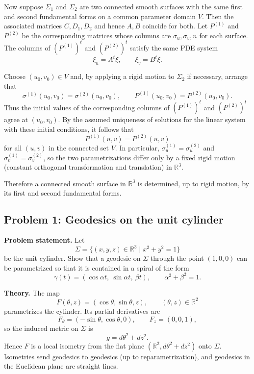 \documentclass[12pt,a4paper]{article}
\theoremstyle{plain}
\theoremstyle{definition}      %
\begin{document}
	Now suppose $\Sigma_1$ and $\Sigma_2$ are two connected smooth surfaces with
	the same first and second fundamental forms on a common parameter domain $V$.
	Then the associated matrices $C,D_1,D_2$ and hence $A,B$ coincide for both.
	Let $P^{(1)}$ and $P^{(2)}$ be the corresponding matrices whose columns are
	$\sigma_u,\sigma_v,n$ for each surface.  The columns of $(P^{(1)})^t$ and
	$(P^{(2)})^t$ satisfy the same PDE system
	\[
	\xi_u = A^t\xi,\qquad \xi_v = B^t\xi.
	\]
	
	Choose $(u_0,v_0)\in V$ and, by applying a rigid motion to $\Sigma_2$ if
	necessary, arrange that
	\[
	\sigma^{(1)}(u_0,v_0)=\sigma^{(2)}(u_0,v_0),\qquad
	P^{(1)}(u_0,v_0)=P^{(2)}(u_0,v_0).
	\]
	Thus the initial values of the corresponding columns of $(P^{(1)})^t$ and
	$(P^{(2)})^t$ agree at $(u_0,v_0)$.  By the assumed uniqueness of solutions
	for the linear system with these initial conditions, it follows that
	\[
	P^{(1)}(u,v)=P^{(2)}(u,v)
	\]
	for all $(u,v)$ in the connected set $V$.  In particular,
	$\sigma^{(1)}_u=\sigma^{(2)}_u$ and $\sigma^{(1)}_v=\sigma^{(2)}_v$, so the two
	parametrizations differ only by a fixed rigid motion (constant orthogonal
	transformation and translation) in $\mathbb{R}^3$.
	
	Therefore a connected smooth surface in $\mathbb{R}^3$ is determined, up to
	rigid motion, by its first and second fundamental forms.
	
	
	\subsection*{Problem 1: Geodesics on the unit cylinder}
	
	\textbf{Problem statement.}
	Let
	\[
	\Sigma=\{(x,y,z)\in\mathbb R^3\mid x^2+y^2=1\}
	\]
	be the unit cylinder. Show that a geodesic on $\Sigma$ through the point $(1,0,0)$
	can be parametrized so that it is contained in a spiral of the form
	\[
	\gamma(t)=(\cos\alpha t,\ \sin\alpha t,\ \beta t),
	\qquad \alpha^2+\beta^2=1.
	\]
	
	\medskip
	\textbf{Theory.}
	The map
	\[
	F(\theta,z) = (\cos\theta,\sin\theta,z),\qquad (\theta,z)\in\mathbb R^2
	\]
	parametrizes the cylinder. Its partial derivatives are
	\[
	F_\theta = (-\sin\theta,\cos\theta,0),\qquad
	F_z = (0,0,1),
	\]
	so the induced metric on $\Sigma$ is
	\[
	g = d\theta^2 + dz^2.
	\]
	Hence $F$ is a local isometry from the flat plane $(\mathbb R^2,d\theta^2+dz^2)$
	onto $\Sigma$. Isometries send geodesics to geodesics (up to reparametrization),
	and geodesics in the Euclidean plane are straight lines.
	
\end{document}
